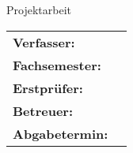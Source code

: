 \begin{titlepage}
    \begin{center}
    	\vfill
    	\begingroup
            \fontsize{14pt}{20pt}\selectfont
            {\bfseries \hochschule\par}
            {\bfseries \fakultaet\par}
            {\bfseries \studiengang\par}
        \endgroup
        \vfill
    	\begingroup
            \fontsize{18pt}{22pt}\selectfont
            {\bfseries \titel\par}
            \fontsize{16pt}{20pt}\selectfont
            {\bfseries \untertitel\par}
        \endgroup
    	\vfill
    	\begingroup
        	\fontsize{12pt}{12pt}\selectfont
        	{Projektarbeit\par}
        \endgroup
        \vfill
        \begin{flushleft}
        	\begin{tabular}{ll}
        		\textbf{Verfasser:} & \autor\\
        		\textbf{Fachsemester:} & \fachsemester\\
        		\textbf{Erstprüfer:} & \erstPruefer\\
        		\textbf{Betreuer:} & \betreuer\\
        		\textbf{Abgabetermin:} & \abgabeTermin\\
        	\end{tabular}
        \end{flushleft}
    \end{center}
\end{titlepage}
